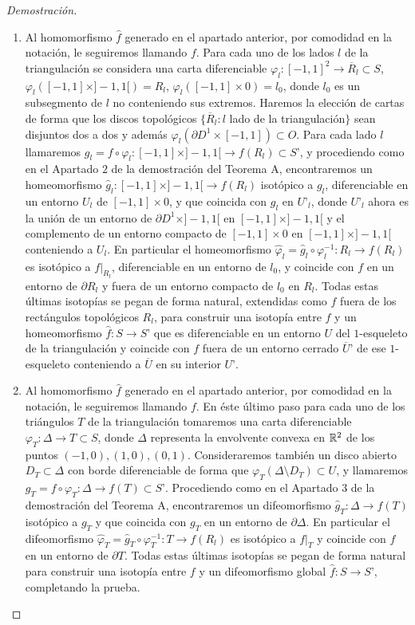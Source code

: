 \begin{proof}[Demostración]
\begin{enumerate}
		\item Al homomorfismo $\hat f$ generado en el apartado anterior, por comodidad en la notación, le seguiremos llamando $f$. Para cada uno de los lados $l$ de la triangulación se considera una carta diferenciable $\varphi_l\colon [-1,1]^2\to \overline{R}_l\subset S$, $\varphi_l([-1,1]\times ]-1,1[)=R_l$, $\varphi_l([-1,1] \times 0)=l_0$, donde $l_0$ es un subsegmento de $l$ no conteniendo sus extremos. Haremos la elección de cartas de forma que los discos topológicos $\{\overline{R}_l\colon l$ lado de la triangulación$\}$ sean disjuntos dos a dos y además $\varphi_l(\partial D^1 \times [-1,1])\subset O$. Para cada lado $l$ llamaremos $g_l=f\circ \varphi_l:[-1,1]\times ]-1,1[\to f(R_l)\subset S’$, y procediendo como en el Apartado $2$ de la demostración del Teorema A, encontraremos un homeomorfismo $\hat g_l:[-1,1]\times ]-1,1[\to f(R_l)$ isotópico a  $g_l$, diferenciable en un entorno $U_l$ de $[-1,1] \times 0$, y que coincida con $g_l$ en $U’_l$, donde $U’_l$ ahora es la unión de un entorno de $\partial D^1 \times ]-1,1[$ en $[-1,1]\times ]-1,1[$  y el complemento de un entorno compacto de $[-1,1] \times 0$ en $[-1,1]\times ]-1,1[$ conteniendo a $U_l$. En particular el homeomorfismo $\hat \varphi_l=\hat g_l\circ \varphi_l^{-1}:R_l\to f(R_l)$ es isotópico a  $f|_{R_l}$, diferenciable en un entorno de $l_0$, y  coincide con $f$ en un entorno de $\partial R_l$ y fuera de un entorno compacto de $l_0$ en $R_l$. Todas estas últimas isotopías se pegan de forma natural, extendidas como $f$ fuera de los rectángulos topológicos $R_l$, para construir una isotopía entre $f$ y un homeomorfismo $\hat f\colon S\to S’$ que es diferenciable en un entorno $U$ del $1$-esqueleto de la triangulación y coincide con $f$ fuera de un entorno cerrado $\overline{U}’$ de ese $1$-esqueleto conteniendo a $\overline U$ en su interior $U’$.

		\item Al homomorfismo $\hat f$ generado en el apartado anterior, por comodidad en la notación, le seguiremos llamando $f$.  En éste último paso para cada uno de los triángulos $T$ de la triangulación tomaremos una carta diferenciable $\varphi_T\colon \Delta \to T\subset S$, donde $\Delta$ representa la envolvente convexa en $\mathbb{R}^2$ de los puntos $(-1,0), (1,0), (0,1)$. Consideraremos también un disco abierto $D_T \subset \Delta$ con borde diferenciable de forma que $\varphi_T(\Delta\setminus D_T)\subset U$, y llamaremos $g_T=f\circ \varphi_T:\Delta \to f(T)\subset S’$. Procediendo como en el Apartado 3 de la demostración del Teorema A, encontraremos un difeomorfismo $\hat g_T:\Delta\to f(T)$ isotópico a  $g_T$ y que coincida con $g_T$ en un entorno de $\partial \Delta$. En particular el difeomorfismo $\hat \varphi_T=\hat g_T\circ \varphi_T^{-1}:T\to f(R_l)$ es isotópico a  $f|_{T}$ y  coincide con $f$ en un entorno de $\partial T$. Todas estas últimas isotopías se pegan de forma natural para construir una isotopía entre $f$ y un difeomorfismo global $\hat f\colon S\to S’$, completando la prueba.
		\end{enumerate}
	\end{proof}
\endinput
